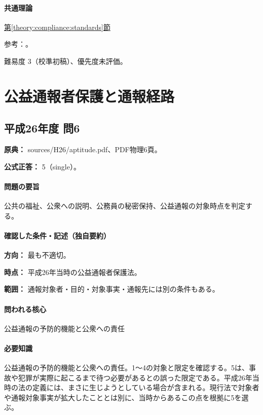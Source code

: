 \paragraph{共通理論} \hyperref[theory:compliance:standards]{第\ref*{theory:compliance:standards}節}

\par 参考：\cite{jisc_isoiec,jisc_certification,jisc_marks,meti_jis2019,mhlw_jis_history}。

\par 難易度 3（校準初稿）、優先度未評価。

\section{公益通報者保護と通報経路}

\subsection{平成26年度 問6}
\label{q:h26-reg-apt-06}

\noindent\textbf{原典：} sources/H26/aptitude.pdf、PDF物理6頁。

\textbf{公式正答：} 5（single）。

\paragraph{問題の要旨} 公共の福祉、公衆への説明、公務員の秘密保持、公益通報の対象時点を判定する。

\paragraph{確認した条件・記述（独自要約）}\mbox{}\par

\noindent\textbf{方向：} 最も不適切。\par

\noindent\textbf{時点：} 平成26年当時の公益通報者保護法。\par

\noindent\textbf{範囲：} 通報対象者・目的・対象事実・通報先には別の条件もある。\par

\paragraph{問われる核心} 公益通報の予防的機能と公衆への責任

\paragraph{必要知識} 公益通報の予防的機能と公衆への責任。1〜4の対象と限定を確認する。5は、事故や犯罪が実際に起こるまで待つ必要があるとの誤った限定である。平成26年当時の法の定義には、まさに生じようとしている場合が含まれる。現行法で対象者や通報対象事実が拡大したこととは別に、当時からあるこの点を根拠に5を選ぶ。

